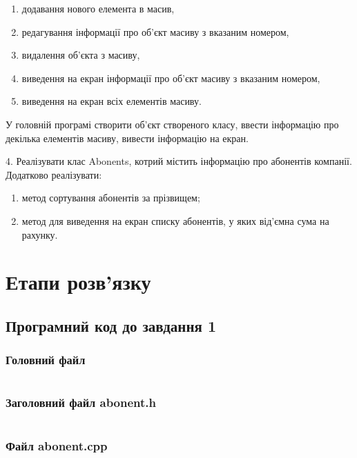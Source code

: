 \documentclass[a4paper, 12pt, oneside]{extarticle}
\begin{document}
\begin{enumerate}
	\item	додавання нового елемента в масив,
	\item	редагування інформації про об’єкт масиву з вказаним номером,
	\item	видалення об’єкта з масиву,
	\item	виведення на екран інформації про об’єкт масиву з вказаним номером,
	\item	виведення на екран всіх елементів масиву.
\end{enumerate}

У головній програмі створити об’єкт створеного класу, ввести інформацію про
декілька елементів масиву, вивести інформацію на екран.

4. Реалізувати клас Abonents, котрий містить інформацію про абонентів
компанії.
Додатково реалізувати:

\begin{enumerate}
	\item метод сортування абонентів за прізвищем;
	\item метод для виведення на екран списку абонентів, у яких від’ємна сума на рахунку.
\end{enumerate}

\section*{Етапи розв'язку}

\subsection*{Програмний код до завдання 1}

\subsubsection*{Головний файл}
\inputminted{c++}{abonent/src/1.cpp}

\subsubsection*{Заголовний файл abonent.h}
\inputminted{c++}{abonent/include/abonent.h}

\subsubsection*{Файл abonent.cpp}
\inputminted{c++}{abonent/src/abonent.cpp}
%
%
\end{document}
